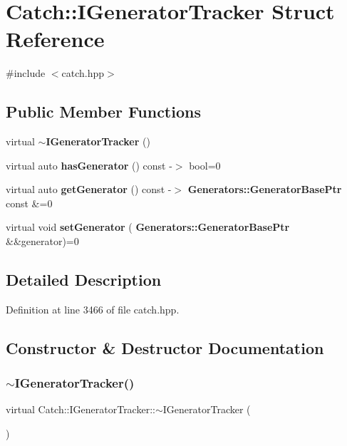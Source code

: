 \section{Catch\+::I\+Generator\+Tracker Struct Reference}
\label{struct_catch_1_1_i_generator_tracker}


{\ttfamily \#include $<$catch.\+hpp$>$}

\subsection*{Public Member Functions}
\begin{DoxyCompactItemize}
\item 
virtual \textbf{ $\sim$\+I\+Generator\+Tracker} ()
\item 
virtual auto \textbf{ has\+Generator} () const -\/$>$ bool=0
\item 
virtual auto \textbf{ get\+Generator} () const -\/$>$ \textbf{ Generators\+::\+Generator\+Base\+Ptr} const \&=0
\item 
virtual void \textbf{ set\+Generator} (\textbf{ Generators\+::\+Generator\+Base\+Ptr} \&\&generator)=0
\end{DoxyCompactItemize}


\subsection{Detailed Description}


Definition at line 3466 of file catch.\+hpp.



\subsection{Constructor \& Destructor Documentation}
\mbox{\label{struct_catch_1_1_i_generator_tracker_a20b3c82baa68f821c180d6dac1234eb1}} 
\subsubsection{$\sim$IGeneratorTracker()}
{\footnotesize\ttfamily virtual Catch\+::\+I\+Generator\+Tracker\+::$\sim$\+I\+Generator\+Tracker (\begin{DoxyParamCaption}{ }\end{DoxyParamCaption})\hspace{0.3cm}{\ttfamily [virtual]}}



